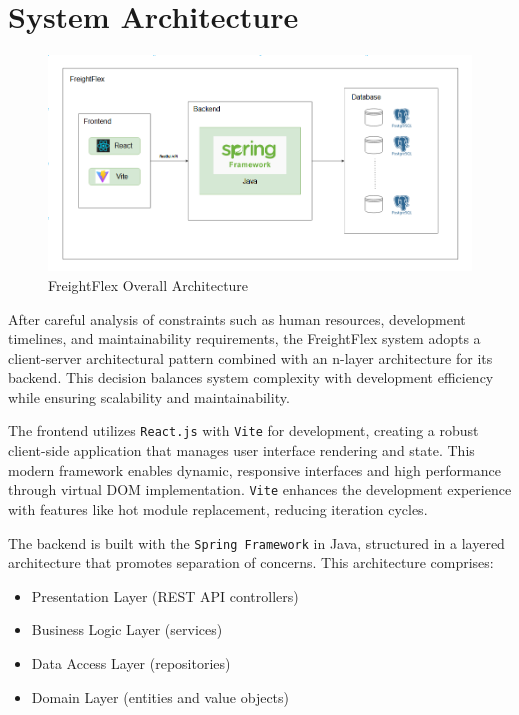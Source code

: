 \section{System Architecture}
\begin{figure}[H]
    \centering
    \includegraphics[width=15cm]{graphics/sys-design/system-architecture.png}
    \caption{FreightFlex Overall Architecture}
    \label{fig:FreightFlex Overall Architecture}
\end{figure}
After careful analysis of constraints such as human resources, development timelines, and maintainability requirements, the FreightFlex system adopts a client-server architectural pattern combined with an n-layer architecture for its backend. This decision balances system complexity with development efficiency while ensuring scalability and maintainability.

The frontend utilizes \texttt{React.js} with \texttt{Vite} for development, creating a robust client-side application that manages user interface rendering and state. This modern framework enables dynamic, responsive interfaces and high performance through virtual DOM implementation. \texttt{Vite} enhances the development experience with features like hot module replacement, reducing iteration cycles.

The backend is built with the \texttt{Spring Framework} in Java, structured in a layered architecture that promotes separation of concerns. This architecture comprises:
\begin{itemize}
    \item Presentation Layer (REST API controllers)
    \item Business Logic Layer (services)
    \item Data Access Layer (repositories)
    \item Domain Layer (entities and value objects)
\end{itemize}

